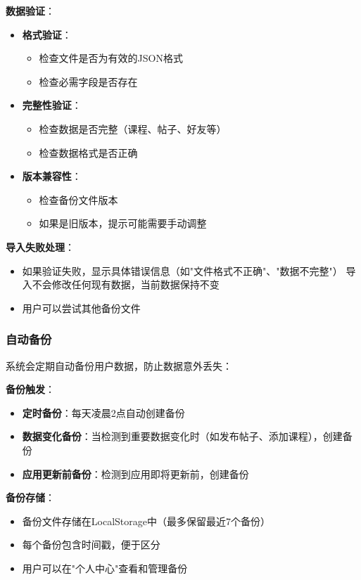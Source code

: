 \documentclass[12pt,a4paper]{article}
\begin{document}
\textbf{数据验证}：
\begin{itemize}
    \item \textbf{格式验证}：
        \begin{itemize}
            \item 检查文件是否为有效的JSON格式
            \item 检查必需字段是否存在
        \end{itemize}
    \item \textbf{完整性验证}：
        \begin{itemize}
            \item 检查数据是否完整（课程、帖子、好友等）
            \item 检查数据格式是否正确
        \end{itemize}
    \item \textbf{版本兼容性}：
        \begin{itemize}
            \item 检查备份文件版本
            \item 如果是旧版本，提示可能需要手动调整
        \end{itemize}
\end{itemize}

\textbf{导入失败处理}：
\begin{itemize}
    \item 如果验证失败，显示具体错误信息（如"文件格式不正确"、"数据不完整"）
    导入不会修改任何现有数据，当前数据保持不变
    \item 用户可以尝试其他备份文件
\end{itemize}

\subsubsection{自动备份}

系统会定期自动备份用户数据，防止数据意外丢失：

\textbf{备份触发}：
\begin{itemize}
    \item \textbf{定时备份}：每天凌晨2点自动创建备份
    \item \textbf{数据变化备份}：当检测到重要数据变化时（如发布帖子、添加课程），创建备份
    \item \textbf{应用更新前备份}：检测到应用即将更新前，创建备份
\end{itemize}

\textbf{备份存储}：
\begin{itemize}
    \item 备份文件存储在LocalStorage中（最多保留最近7个备份）
    \item 每个备份包含时间戳，便于区分
    \item 用户可以在"个人中心"查看和管理备份
\end{itemize}
\end{document}
